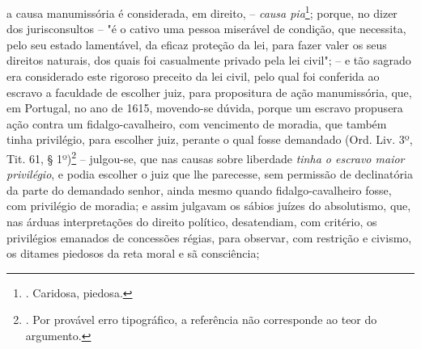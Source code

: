 a causa manumissória é considerada, em direito, -- \emph{causa
pia}\footnote{. Caridosa, piedosa.}; porque, no dizer dos jurisconsultos
-- "é o cativo uma pessoa miserável de condição, que necessita, pelo seu
estado lamentável, da eficaz proteção da lei, para fazer valer os seus
direitos naturais, dos quais foi casualmente privado pela lei civil"; --
e tão sagrado era considerado este rigoroso preceito da lei civil, pelo
qual foi conferida ao escravo a faculdade de escolher juiz, para
propositura de ação manumissória, que, em Portugal, no ano de 1615,
movendo-se dúvida, porque um escravo propusera ação contra um
fidalgo-cavalheiro, com vencimento de moradia, que também tinha
privilégio, para escolher juiz, perante o qual fosse demandado (Ord.
Liv. 3º, Tit. 61, § 1º)\footnote{. Por provável erro tipográfico, a
  referência não corresponde ao teor do argumento.} -- julgou-se, que
nas causas sobre liberdade \emph{tinha o escravo maior privilégio}, e
podia escolher o juiz que lhe parecesse, sem permissão de declinatória
da parte do demandado senhor, ainda mesmo quando fidalgo-cavalheiro
fosse, com privilégio de moradia; e assim julgavam os sábios juízes do
absolutismo, que, nas árduas interpretações do direito político,
desatendiam, com critério, os privilégios emanados de concessões régias,
para observar, com restrição e civismo, os ditames piedosos da reta
moral e sã consciência;

